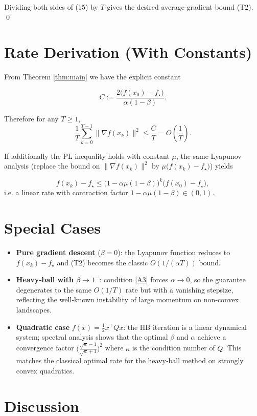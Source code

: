 \documentclass{article}
\begin{document}
Dividing both sides of (15) by $T$ gives the desired average‑gradient bound (T2).  \qed

\section*{Rate Derivation (With Constants)}

From Theorem \ref{thm:main} we have the explicit constant

\[
C:=\frac{2\bigl(f(x_{0})-f_{\star}\bigr)}{\alpha(1-\beta)}.
\]

Therefore for any $T\ge1$,
\[
\frac{1}{T}\sum_{k=0}^{T-1}\|\nabla f(x_{k})\|^{2}\le\frac{C}{T}=O\!\left(\frac{1}{T}\right).
\]

If additionally the PL inequality holds with constant $\mu$, the same Lyapunov analysis (replace the bound on $\|\nabla f(x_{k})\|^{2}$ by $\mu\bigl(f(x_{k})-f_{\star}\bigr)$) yields

\[
f(x_{k})-f_{\star}\le\bigl(1-\alpha\mu(1-\beta)\bigr)^{k}\bigl(f(x_{0})-f_{\star}\bigr),
\]
i.e. a linear rate with contraction factor $1-\alpha\mu(1-\beta)\in(0,1)$.

\section*{Special Cases}

\begin{itemize}
\item \textbf{Pure gradient descent} ($\beta=0$): the Lyapunov function reduces to $f(x_{k})-f_{\star}$ and (T2) becomes the classic $O(1/(\alpha T))$ bound.
\item \textbf{Heavy‑ball with $\beta\to1^{-}$}: condition \eqref{A3} forces $\alpha\to0$, so the guarantee degenerates to the same $O(1/T)$ rate but with a vanishing stepsize, reflecting the well‑known instability of large momentum on non‑convex landscapes.
\item \textbf{Quadratic case} $f(x)=\frac{1}{2}x^{\top}Qx$: the HB iteration is a linear dynamical system; spectral analysis shows that the optimal $\beta$ and $\alpha$ achieve a convergence factor $ \bigl(\frac{\sqrt{\kappa}-1}{\sqrt{\kappa}+1}\bigr)^{2}$ where $\kappa$ is the condition number of $Q$.  This matches the classical optimal rate for the heavy‑ball method on strongly convex quadratics.
\end{itemize}

\section*{Discussion}
\end{document}
